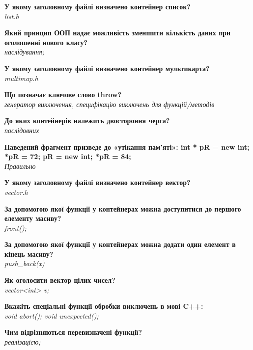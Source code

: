 \documentclass{article}
\begin{document}
\begin{list}{}{}
	\item \textbf{У якому заголовному файлі визначено контейнер список?} \\ \textit{list.h}
	\item \textbf{Який принцип ООП надає можливість зменшити кількість даних при оголошенні
		нового класу?} \\ \textit{наслідування;}
	\item \textbf{У якому заголовному файлі визначено контейнер мультикарта?} \\ \textit{multimap.h}
	\item \textbf{Що позначає ключове слово throw?} \\ \textit{генератор виключення, специфікацію виключень для функцій/методів}
	\item \textbf{До яких контейнерів належить двостороння черга?} \\ \textit{послідовних}
	\item \textbf{Наведений фрагмент призведе до «утікання пам’яті»: int * pR = new int; *pR = 72;
		pR = new int; *pR = 84;} \\ \textit{Правильно}
	\item \textbf{У якому заголовному файлі визначено контейнер вектор?} \\ \textit{vector.h}
	\item \textbf{За допомогою якої функції у контейнерах можна доступитися до першого елементу
		масиву?} \\ \textit{front();}
	\item \textbf{За допомогою якої функції у контейнерах можна додати один елемент в кінець
		масиву?} \\ \textit{push\_back(x)}
	\item \textbf{Як оголосити вектор цілих чисел?} \\ \textit{vector<int> v;}
	\item \textbf{Вкажіть спеціальні функції обробки виключень в мові C++:} \\ \textit{void abort(); void unexpected();}
	\item \textbf{Чим відрізняються перевизначені функції?} \\ \textit{реалізацією;}
	\item \textbf{} \\ \textit{}
	\item \textbf{} \\ \textit{}
	\item \textbf{} \\ \textit{}
	\item \textbf{} \\ \textit{}

\end{list}
\end{document}
